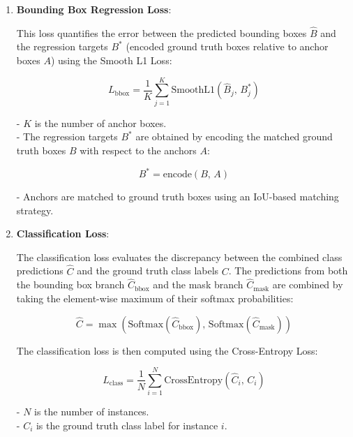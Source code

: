 \begin{enumerate}
    \item \textbf{Bounding Box Regression Loss}:

    This loss quantifies the error between the predicted bounding boxes \( \hat{B} \) and the regression targets \( B^* \) (encoded ground truth boxes relative to anchor boxes \( A \)) using the Smooth L1 Loss:
    
    \begin{equation}
        L_{\text{bbox}} = \frac{1}{K} \sum_{j=1}^{K} \text{SmoothL1}\left( \hat{B}_j, \, B^*_j \right) \tag{12}
    \end{equation}
    
    - \( K \) is the number of anchor boxes. \\ 
    - The regression targets \( B^* \) are obtained by encoding the matched ground truth boxes \( B \) with respect to the anchors \( A \):
    
      \begin{equation}
        B^* = \text{encode}\left( B, \, A \right) \tag{13}
      \end{equation}
    
    - Anchors are matched to ground truth boxes using an IoU-based matching strategy.

    \item \textbf{Classification Loss}:

    The classification loss evaluates the discrepancy between the combined class predictions \( \hat{C} \) and the ground truth class labels \( C \). 
    The predictions from both the bounding box branch \( \hat{C}_{\text{bbox}} \) and the mask branch \( \hat{C}_{\text{mask}} \) are combined by 
    taking the element-wise maximum of their softmax probabilities:
    
    \begin{equation}
        \hat{C} = \max\left( \text{Softmax}\left( \hat{C}_{\text{bbox}} \right), \, \text{Softmax}\left( \hat{C}_{\text{mask}} \right) \right) \tag{14}
    \end{equation}

    
    The classification loss is then computed using the Cross-Entropy Loss:
    
    \begin{equation}
        L_{\text{class}} = \frac{1}{N} \sum_{i=1}^{N} \text{CrossEntropy}\left( \hat{C}_i, \, C_i \right) \tag{15}
    \end{equation}
    
    - \( N \) is the number of instances. \\
    - \( C_i \) is the ground truth class label for instance \( i \).

\end{enumerate}


